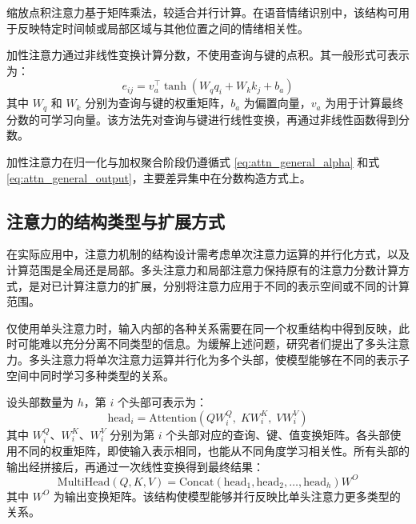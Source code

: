 缩放点积注意力基于矩阵乘法，较适合并行计算。在语音情绪识别中，该结构可用于反映特定时间帧或局部区域与其他位置之间的情绪相关性\cite{vaswani2017attention,he2023multiple}。

加性注意力通过非线性变换计算分数，不使用查询与键的点积。其一般形式可表示为：
\begin{equation}
e_{ij} = v_a^\top \tanh(W_q q_i + W_k k_j + b_a)
\label{eq:additive_attention_score}
\end{equation}
其中 $W_q$ 和 $W_k$ 分别为查询与键的权重矩阵，$b_a$ 为偏置向量，$v_a$ 为用于计算最终分数的可学习向量。该方法先对查询与键进行线性变换，再通过非线性函数得到分数\cite{mirsamadi2017automatic}。

加性注意力在归一化与加权聚合阶段仍遵循式 \eqref{eq:attn_general_alpha} 和式 \eqref{eq:attn_general_output}，主要差异集中在分数构造方式上\cite{mirsamadi2017automatic}。


\subsection{注意力的结构类型与扩展方式}

在实际应用中，注意力机制的结构设计需考虑单次注意力运算的并行化方式，以及计算范围是全局还是局部。多头注意力和局部注意力保持原有的注意力分数计算方式，是对已计算注意力的扩展，分别将注意力应用于不同的表示空间或不同的计算范围\cite{vaswani2017attention,chen2023dwformer,wang2024swin,mirsamadi2017automatic}。

仅使用单头注意力时，输入内部的各种关系需要在同一个权重结构中得到反映，此时可能难以充分分离不同类型的信息。为缓解上述问题，研究者们提出了多头注意力\cite{vaswani2017attention,chen2023dwformer,wang2024swin}。多头注意力将单次注意力运算并行化为多个头部，使模型能够在不同的表示子空间中同时学习多种类型的关系。

设头部数量为 $h$，第 $i$ 个头部可表示为：
\begin{equation}
\mathrm{head}_i = \mathrm{Attention}(QW_i^Q,\; KW_i^K,\; VW_i^V)
\label{eq:multihead_head}
\end{equation}
其中 $W_i^Q$、$W_i^K$、$W_i^V$ 分别为第 $i$ 个头部对应的查询、键、值变换矩阵。各头部使用不同的权重矩阵，即使输入表示相同，也能从不同角度学习相关性。所有头部的输出经拼接后，再通过一次线性变换得到最终结果：
\begin{equation}
\mathrm{MultiHead}(Q,K,V) = \mathrm{Concat}(\mathrm{head}_1,\mathrm{head}_2,\ldots,\mathrm{head}_h)W^O
\label{eq:multihead_output}
\end{equation}
其中 $W^O$ 为输出变换矩阵。该结构使模型能够并行反映比单头注意力更多类型的关系\cite{vaswani2017attention,chen2023dwformer,wang2024swin}。

